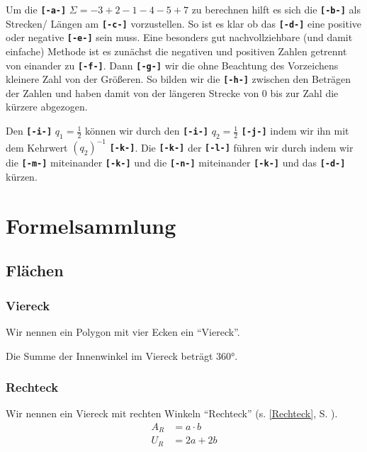 \documentclass[a4paper]{book}%
\theoremstyle{definition}
\begin{document}
\vspace{1em}

Um die \textbf{\texttt{[-a-]}} $\Sigma = -3 +2 -1 -4 -5 +7$ zu berechnen hilft es sich die \textbf{\texttt{[-b-]}} als Strecken/ Längen am \textbf{\texttt{[-c-]}} vorzustellen. So ist es klar ob das \textbf{\texttt{[-d-]}} eine positive oder negative \textbf{\texttt{[-e-]}} sein muss. Eine besonders gut nachvollziehbare (und damit einfache) Methode ist es zunächst die negativen und positiven Zahlen getrennt von einander zu \textbf{\texttt{[-f-]}}. Dann \textbf{\texttt{[-g-]}} wir die ohne Beachtung des Vorzeichens kleinere Zahl von der Größeren. So bilden wir die \textbf{\texttt{[-h-]}} zwischen den Beträgen der Zahlen und haben damit von der längeren Strecke von 0 bis zur Zahl die kürzere abgezogen.

Den \textbf{\texttt{[-i-]}} $q_1 = \frac{1}{2}$ können wir durch den \textbf{\texttt{[-i-]}} $q_2 = \frac{1}{2}$ \textbf{\texttt{[-j-]}} indem wir ihn mit dem Kehrwert ${(q_2)}^{-1}$ \textbf{\texttt{[-k-]}}. Die \textbf{\texttt{[-k-]}} der \textbf{\texttt{[-l-]}} führen wir durch indem wir die \textbf{\texttt{[-m-]}} miteinander \textbf{\texttt{[-k-]}} und die \textbf{\texttt{[-n-]}} miteinander \textbf{\texttt{[-k-]}} und das \textbf{\texttt{[-d-]}} kürzen.

\printglossary
\printglossary[type=symbols,style=long]

\chapter{Formelsammlung}

\section{Flächen}

\subsection{Viereck}\label{fs:Viereck}

Wir nennen ein Polygon mit vier Ecken ein \enquote{Viereck}.

Die Summe der Innenwinkel im Viereck beträgt 360°.


\subsection{Rechteck}\label{fs:Rechteck}

Wir nennen ein Viereck mit rechten Winkeln \enquote{Rechteck} (s. \ref{Rechteck}, S. \pageref{Rechteck}).
\begin{align}\label{eqn:fsRechteck}
    A_R &= a \cdot b\\
    U_R &= 2a + 2b
\end{align}
\end{document}
